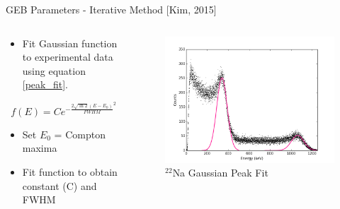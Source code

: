 \documentclass{beamer}
\begin{document}
\begin{frame}{GEB Parameters - Iterative Method [Kim, 2015]}
  \begin{columns}
      \begin{column}{0.5\textwidth}
		\begin{itemize}
        \item Fit Gaussian function to experimental data using equation \ref{peak_fit}. \cite{Kim}
        \end{itemize}
        \begin{equation} \label{peak_fit}
          f(E) = C e^{-\frac{2\sqrt{\ln{2}}(E - E_0)}{FWHM}^2}
        \end{equation}
        \begin{itemize}
        \item Set $E_0$ = Compton maxima 
		\item Fit function to obtain constant (C) and FWHM
		\end{itemize}
	\end{column}
	\begin{column}{0.5\textwidth}
	   \begin{figure}[H]
       \vspace*{-1cm}
       \begin{center}
	   \includegraphics[scale = 0.3]{GaussPeakFit}
       \caption{\scriptsize{$^{22}$Na Gaussian Peak Fit}}
	   \end{center}
      \end{figure}
	\end{column}
  \end{columns}
\end{frame}
\end{document}
